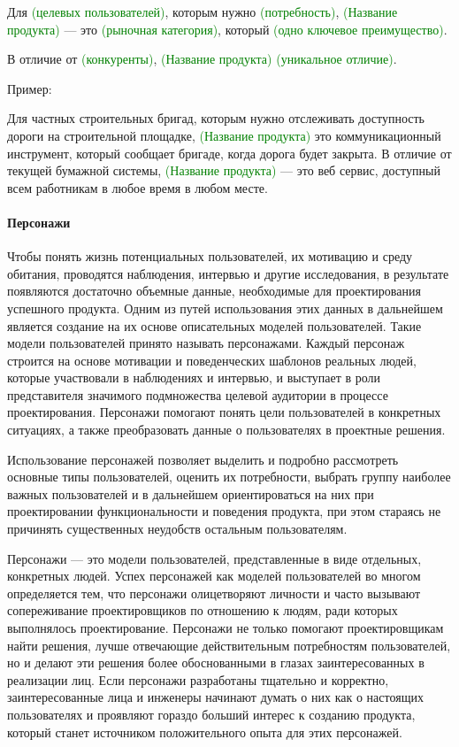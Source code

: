 \documentclass{../../text-style}
\begin{document}
Для \textcolor{green}{(целевых пользователей)}, которым нужно \textcolor{green}{(потребность)}, \textcolor{green}{(Название продукта)} --- это \textcolor{green}{(рыночная категория)}, который \textcolor{green}{(одно ключевое преимущество)}.

\vspace{5mm}

В отличие от \textcolor{green}{(конкуренты)}, \textcolor{green}{(Название продукта)} \textcolor{green}{(уникальное отличие)}.

Пример:

Для частных строительных бригад, которым нужно отслеживать доступность дороги на строительной площадке, \textcolor{green}{(Название продукта)} это коммуникационный инструмент, который сообщает бригаде, когда дорога будет закрыта. В отличие от текущей бумажной системы, \textcolor{green}{(Название продукта)} --- это веб сервис, доступный всем работникам в любое время в любом месте.

\paragraph{Персонажи}

Чтобы понять жизнь потенциальных пользователей, их мотивацию и среду обитания, проводятся наблюдения, интервью и другие исследования, в результате появляются достаточно объемные данные, необходимые для проектирования успешного продукта. Одним из путей использования этих данных в дальнейшем является создание на их основе описательных моделей пользователей. Такие модели пользователей принято называть персонажами. Каждый персонаж строится на основе мотивации и поведенческих шаблонов реальных людей, которые участвовали в наблюдениях и интервью, и выступает в роли представителя значимого подмножества целевой аудитории в процессе проектирования. Персонажи помогают понять цели пользователей в конкретных ситуациях, а также преобразовать данные о пользователях в проектные решения.

Использование персонажей позволяет выделить и подробно рассмотреть основные типы пользователей, оценить их потребности, выбрать группу наиболее важных пользователей и в дальнейшем ориентироваться на них при проектировании функциональности и поведения продукта, при этом стараясь не причинять существенных неудобств остальным пользователям.

Персонажи --- это модели пользователей, представленные в виде отдельных, конкретных людей. Успех персонажей как моделей пользователей во многом определяется тем, что персонажи олицетворяют личности и часто вызывают сопереживание проектировщиков по отношению к людям, ради которых выполнялось проектирование. Персонажи не только помогают проектировщикам найти решения, лучше отвечающие действительным потребностям пользователей, но и делают эти решения более обоснованными в глазах заинтересованных в реализации лиц. Если персонажи разработаны тщательно и корректно, заинтересованные лица и инженеры начинают думать о них как о настоящих пользователях и проявляют гораздо больший интерес к созданию продукта, который станет источником положительного опыта для этих персонажей.
\end{document}
